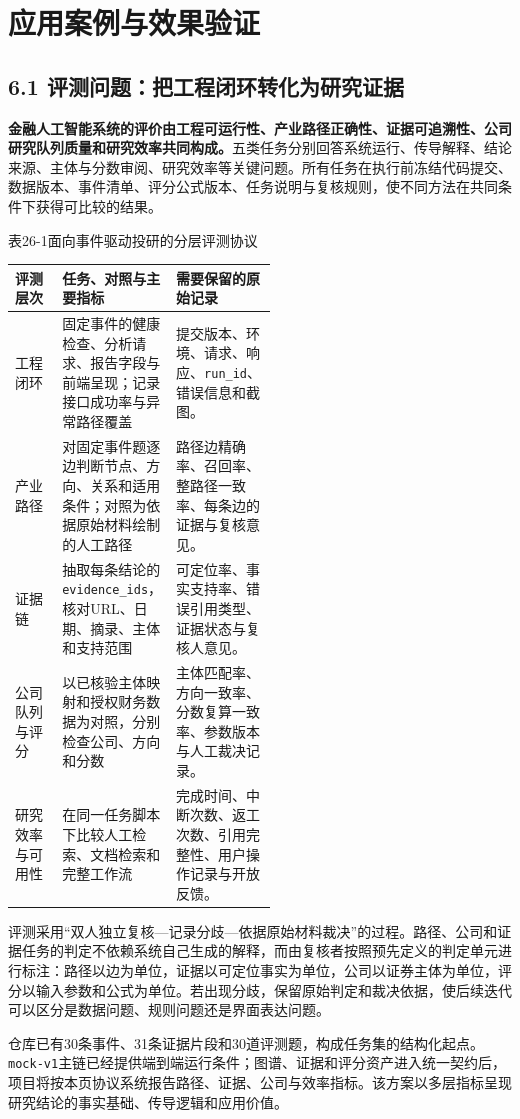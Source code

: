 \clearpage
\section{应用案例与效果验证}
\subsection*{6.1 评测问题：把工程闭环转化为研究证据}\label{page:26}
\noindent\textbf{金融人工智能系统的评价由工程可运行性、产业路径正确性、证据可追溯性、公司研究队列质量和研究效率共同构成。}五类任务分别回答系统运行、传导解释、结论来源、主体与分数审阅、研究效率等关键问题。所有任务在执行前冻结代码提交、数据版本、事件清单、评分公式版本、任务说明与复核规则，使不同方法在共同条件下获得可比较的结果。

\begin{center}\small 表26-1\quad 面向事件驱动投研的分层评测协议\par\vspace{1mm}
\begin{tabularx}{\linewidth}{p{0.18\linewidth}p{0.34\linewidth}X}
\toprule
评测层次 & 任务、对照与主要指标 & 需要保留的原始记录\\
\midrule
工程闭环 & 固定事件的健康检查、分析请求、报告字段与前端呈现；记录接口成功率与异常路径覆盖 & 提交版本、环境、请求、响应、\texttt{run\_id}、错误信息和截图。\\
产业路径 & 对固定事件题逐边判断节点、方向、关系和适用条件；对照为依据原始材料绘制的人工路径 & 路径边精确率、召回率、整路径一致率、每条边的证据与复核意见。\\
证据链 & 抽取每条结论的\texttt{evidence\_ids}，核对URL、日期、摘录、主体和支持范围 & 可定位率、事实支持率、错误引用类型、证据状态与复核人意见。\\
公司队列与评分 & 以已核验主体映射和授权财务数据为对照，分别检查公司、方向和分数 & 主体匹配率、方向一致率、分数复算一致率、参数版本与人工裁决记录。\\
研究效率与可用性 & 在同一任务脚本下比较人工检索、文档检索和完整工作流 & 完成时间、中断次数、返工次数、引用完整性、用户操作记录与开放反馈。\\
\bottomrule
\end{tabularx}\end{center}

评测采用“双人独立复核—记录分歧—依据原始材料裁决”的过程。路径、公司和证据任务的判定不依赖系统自己生成的解释，而由复核者按照预先定义的判定单元进行标注：路径以边为单位，证据以可定位事实为单位，公司以证券主体为单位，评分以输入参数和公式为单位。若出现分歧，保留原始判定和裁决依据，使后续迭代可以区分是数据问题、规则问题还是界面表达问题。

仓库已有30条事件、31条证据片段和30道评测题，构成任务集的结构化起点\cite{lhy-evidence}。\texttt{mock-v1}主链已经提供端到端运行条件；图谱、证据和评分资产进入统一契约后，项目将按本页协议系统报告路径、证据、公司与效率指标。该方案以多层指标呈现研究结论的事实基础、传导逻辑和应用价值。
